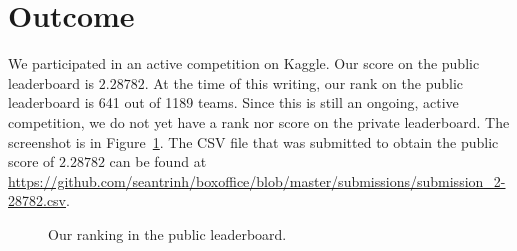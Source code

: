 \documentclass[11pt]{article}
\numberwithin{equation}{section}
\begin{document}
\section{Outcome}

We participated in an active competition on Kaggle. Our score on the public leaderboard is $2.28782$. At the time of this writing, our rank on the public leaderboard is 641 out of 1189 teams. Since this is still an ongoing, active competition, we do not yet have a rank nor score on the private leaderboard. 
The screenshot is in Figure~\ref{fig:leaderboard}. The CSV file that was submitted to obtain the public score of $2.28782$ can be found at \url{https://github.com/seantrinh/boxoffice/blob/master/submissions/submission_2-28782.csv}.

\begin{figure}
	\begin{center}
	\end{center}
	\caption{Our ranking in the public leaderboard.}
	\label{fig:leaderboard}
\end{figure}



%



\end{document}
